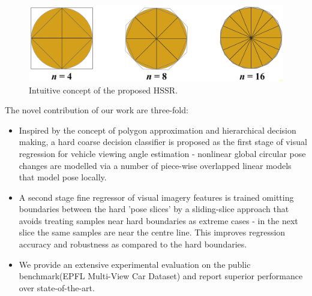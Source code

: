 \documentclass{tutmscthesis}[2010/09/22]
\numberwithin{equation}{section}
\numberwithin{table}{section}
\numberwithin{figure}{section}
\begin{document}
\begin{figure}[t]
\centering
\includegraphics[width=0.98\linewidth]{intuition.png}
\caption{Intuitive concept of the proposed HSSR.}
\label{fig:concept} 
\end{figure}




The novel contribution of our work are three-fold:
\begin{itemize}
\item Inspired by the concept of polygon approximation and hierarchical decision making, a hard coarse decision classifier is proposed as the first stage of visual regression for vehicle viewing angle estimation - nonlinear global circular pose changes are modelled via a number of piece-wise overlapped linear models that model pose locally.
\item A second stage fine regressor of visual imagery features is trained omitting boundaries between the hard 'pose slices' by a sliding-slice approach that avoids treating samples near hard boundaries as extreme cases - in the next slice the same samples are near the centre line. This improves regression accuracy and robustness as compared to the hard boundaries.
\item We provide an extensive experimental evaluation on the public benchmark(EPFL Multi-View Car Dataset) and report superior performance over state-of-the-art.
\end{itemize}
\end{document}

